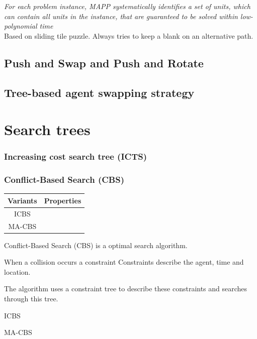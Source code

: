 \documentclass[a4paper,11pt]{article}
\begin{document}
\textit{For each problem instance, MAPP systematically identifies a set of units, which can contain all units in the instance, that are guaranteed to be solved within low-polynomial time} \\

Based on sliding tile puzzle. Always tries to keep a blank on an alternative path.

\subsection{Push and Swap and Push and Rotate}

\subsection{Tree-based agent swapping strategy}


\section{Search trees}
\subsubsection{Increasing cost search tree (ICTS)}


\subsubsection{Conflict-Based Search (CBS)}

\begin{table}
	\begin{tabular}{ c c }
		Variants & Properties \\
		\hline
		ICBS &   \\
		MA-CBS & \\
		
	\end{tabular}
\end{table}
	

Conflict-Based Search (CBS) is a optimal search algorithm.

When a collision occurs a constraint 
Constraints describe the agent, time and location.

The algorithm uses a constraint tree to describe these constraints and searches through this tree.

ICBS

MA-CBS
\end{document}
